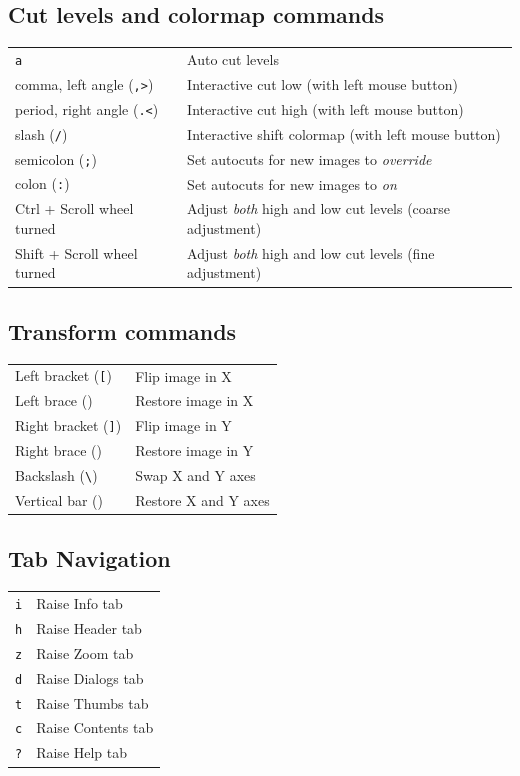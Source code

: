 \documentclass[11pt]{report}
\begin{document}
\subsection{Cut levels and colormap commands}
\begin{tabularx}{\textwidth}{lX}
{\tt a} & Auto cut levels \\
comma, left angle ({\tt ,\textgreater{}}) & Interactive cut low (with left mouse button) \\ 
period, right angle ({\tt .\textless{}}) & Interactive cut high (with left mouse
button) \\ 
slash ({\tt /}) & Interactive shift colormap (with left mouse button) \\
semicolon ({\tt ;}) & Set autocuts for new images to {\em override} \\
colon ({\tt :}) & Set autocuts for new images to {\em on} \\
Ctrl + Scroll wheel turned & Adjust \emph{both} high and low cut levels
(coarse adjustment) \\
Shift + Scroll wheel turned & Adjust \emph{both} high and low cut levels
(fine adjustment) \\
\end{tabularx}

\subsection{Transform commands}
\begin{tabularx}{\textwidth}{lX}
Left bracket ({\tt [}) & Flip image in X \\
Left brace ({\tt \textbraceleft{}}) & Restore image in X \\
Right bracket ({\tt ]}) & Flip image in Y \\
Right brace ({\tt \textbraceright{}}) & Restore image in Y \\
Backslash ({\tt \textbackslash{}}) & Swap X and Y axes \\
Vertical bar ({\tt \textbar{}}) & Restore X and Y axes \\
\end{tabularx}

\subsection{Tab Navigation}
\begin{tabularx}{\textwidth}{lX}
{\tt i} & Raise Info tab \\
{\tt h} & Raise Header tab \\
{\tt z} & Raise Zoom tab \\
{\tt d} & Raise Dialogs tab \\
{\tt t} & Raise Thumbs tab \\
{\tt c} & Raise Contents tab \\
{\tt ?} & Raise Help tab \\
\end{tabularx}
\end{document}

